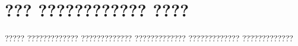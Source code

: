 
\chapter{??? ???????????? ????}

????? ????????????? ????????????? ????????????? ????????????? ????????????? 

